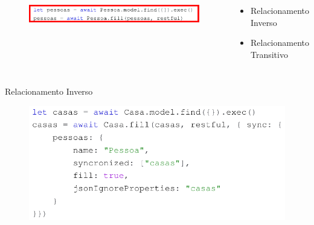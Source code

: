 \documentclass{beamer} %
\begin{document}
\begin{frame}
\begin{columns}
    \begin{figure}
        \centering
        \includegraphics[width= \textwidth]{imagens/fill-alpha-restful.png}
        \label{fig:fill-alpha-restful}
    \end{figure}
    
    \vspace*{-0.5cm}
    
    \begin{itemize}
        \item<2-> \small{Relacionamento Inverso}
        \item<2-> \small{Relacionamento Transitivo}
    \end{itemize}
\end{columns}
\end{frame}

\begin{frame}{Relacionamento Inverso}
    \begin{figure}
        \centering
        \includegraphics[width=\linewidth]{imagens/relacionamento-inverso-alpha-restful.png}
        \label{fig:relacionamento-inverso-alpha-restful}
    \end{figure}
\end{frame}
\end{document}

